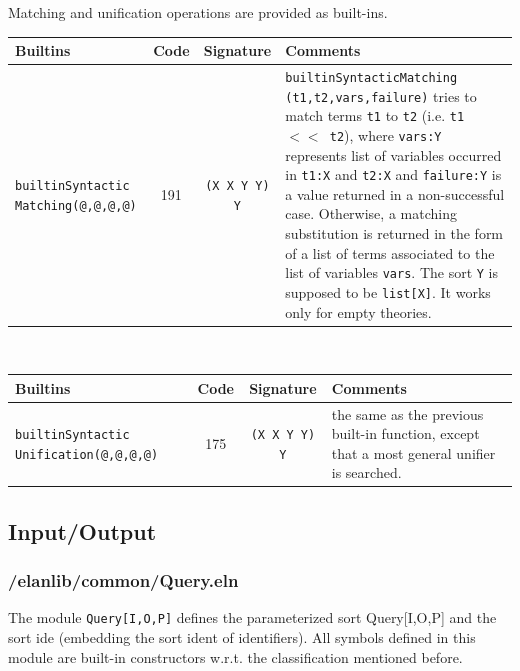
Matching and unification operations are provided as built-ins.\\

\noindent \begin{tabular}{|p{4cm}|c|c|p{}|}
\hline
{\bf Builtins} & {\bf Code} & {\bf Signature} & {\bf Comments} \\
\hline
\hline
{\tt builtinSyntactic Matching(@,@,@,@)}         & 191 & {\tt (X X Y Y) Y} & {\tt builtinSyntacticMatching (t1,t2,vars,failure)} tries to match terms {\tt t1} to {\tt t2} (i.e. {\tt t1 $<<$ t2}), where {\tt vars:Y} represents list of variables occurred in {\tt t1:X} and {\tt t2:X} and {\tt failure:Y} is a value returned in a non-successful case. Otherwise, a matching substitution is returned in the form of a list of terms associated to the list of variables {\tt vars}. The sort {\tt Y} is supposed to be {\tt list[X]}. It works only for empty theories.\\
\hline
\end{tabular}
~\\
\begin{tabular}{|p{4cm}|c|c|p{}|}
\hline
{\bf Builtins} & {\bf Code} & {\bf Signature} & {\bf Comments} \\
\hline
\hline{\tt builtinSyntactic Unification(@,@,@,@)}      & 175 & {\tt (X X Y Y) Y} & the same as the previous built-in function, except that a most general unifier is searched.\\
\hline
\end{tabular}


\subsection{Input/Output}

\subsubsection{/elanlib/common/Query.eln}


The module {\tt Query[I,O,P]}
defines the parameterized sort Query[I,O,P] and the sort ide 
(embedding the sort ident of identifiers).
All symbols defined in this module are built-in constructors
w.r.t. the classification mentioned before.\\


